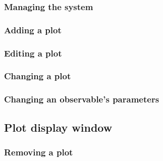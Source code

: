             \subsubsection{Managing the system}
            
            \subsubsection{Adding a plot}
            \subsubsection{Editing a plot}
            \subsubsection{Changing a plot}
            \subsubsection{Changing an observable's parameters}
    
        
    \subsection{Plot display window}
            \subsubsection{Removing a plot}
        
